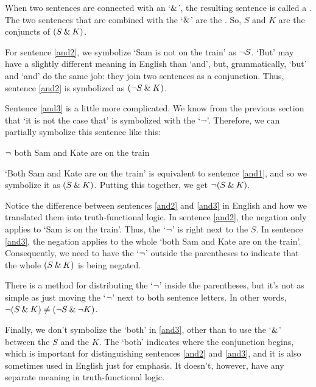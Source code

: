 When two sentences are connected with an `$\mathbin{\&}$', the resulting sentence is called a . The two sentences that are combined with the `$\mathbin{\&}$' are the . So, $S$ and $K$ are the conjuncts of $(S \mathbin{\&} K)$.

For sentence \ref{and2}, we symbolize `Sam is not on the train' as ${\neg} S$. `But' may have a slightly different meaning in English than `and', but, grammatically, `but' and `and' do the same job: they join two sentences as a conjunction. Thus, sentence \ref{and2} is symbolized as $({\neg} S \mathbin{\&} K)$.

Sentence \ref{and3} is a little more complicated. We know from the previous section that `it is not the case that' is symbolized with the `${\neg}$'. Therefore, we can partially symbolize this sentence like this:
	\begin{earg}
		\item[] ${\neg}$ both Sam and Kate are on the train
	\end{earg}
`Both Sam and Kate are on the train' is equivalent to sentence \ref{and1}, and so we symbolize it as $(S \mathbin{\&} K)$. Putting this together, we get ${\neg}(S \mathbin{\&} K)$. 

Notice the difference between sentences \ref{and2} and \ref{and3} in English and how we translated them into truth-functional logic. In sentence \ref{and2}, the negation only applies to `Sam is on the train'. Thus, the `${\neg}$' is right next to the $S$. In sentence \ref{and3}, the negation applies to the whole `both Sam and Kate are on the train'. Consequently, we need to have the `${\neg}$' outside the parentheses to indicate that the whole $(S \mathbin{\&} K)$ is being negated.

\begin{notebox}
There is a method for distributing the `${\neg}$' inside the parentheses, but it's not as simple as just moving the `${\neg}$' next to both sentence letters. In other words,  ${\neg}(S \mathbin{\&} K) \neq ({\neg} S \mathbin{\&} {\neg} K)$.  
\end{notebox}

Finally, we don't symbolize the `both' in \ref{and3}, other than to use the `$\mathbin{\&}$' between the $S$ and the $K$. The `both' indicates where the conjunction begins, which is important for distinguishing sentences \ref{and2} and \ref{and3}, and it is also sometimes used in English just for emphasis. It doesn't, however, have any separate meaning in truth-functional logic.


